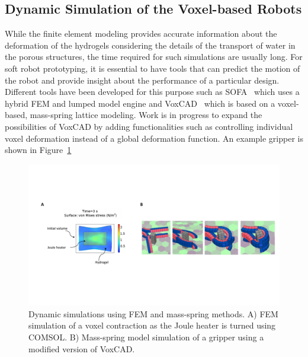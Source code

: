 \subsection{Dynamic Simulation of the Voxel-based Robots}
While the finite element modeling provides accurate information about the deformation of the hydrogels considering the details of the transport of water in the porous structures, the time required for such simulations are usually long. For soft robot prototyping, it is essential to have tools that can predict the motion of the robot and provide insight about the performance of a particular design. Different tools have been developed for this purpose such as SOFA~\cite{} which uses a hybrid FEM and lumped model engine and VoxCAD~\cite{} which is based on a voxel-based, mass-spring lattice modeling. Work is in progress to expand the possibilities of VoxCAD by adding functionalities such as controlling individual voxel deformation instead of a global deformation function. An example gripper is shown in Figure~\ref{fig:voxcad}
\begin{figure}[!t]
\centering
\includegraphics[width=\textwidth]{voxcad.pdf}
    \caption[Dynamic simulations]{Dynamic simulations using FEM and mass-spring methods. A) FEM simulation of a voxel contraction as the Joule heater is turned using COMSOL. B) Mass-spring model simulation of a gripper using a modified version of VoxCAD. }
    \label{fig:voxcad}
\end{figure}

